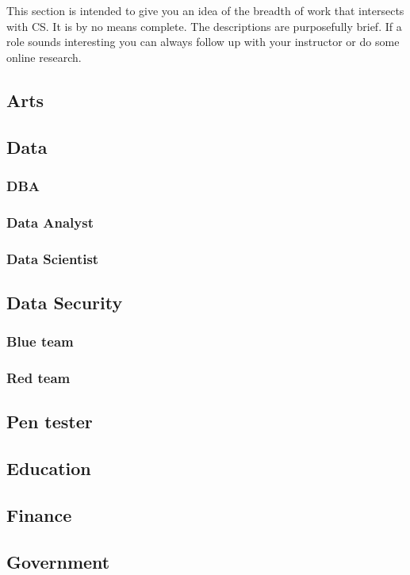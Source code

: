 This section is intended to give you an idea of the breadth of work that intersects with CS. It is by no means complete. The descriptions are purposefully brief. If a role sounds interesting you can always follow up with your instructor or do some online research.

\subsection{Arts}

\subsection{Data}
\subsubsection{DBA}
\subsubsection{Data Analyst}
\subsubsection{Data Scientist}

\subsection{Data Security}
\subsubsection{Blue team}
\subsubsection{Red team}
\subsection{Pen tester}

\subsection{Education}

\subsection{Finance}

\subsection{Government}

